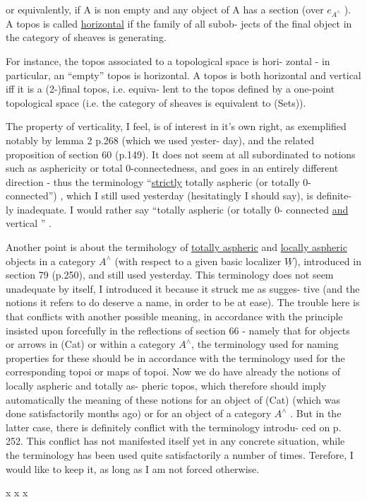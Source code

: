 or equivalently,  if A is non empty and any object of A has a section
(over $e_{A^\wedge}$ ).  A topos is called \uline{horizontal} if the family of all subob-%
jects of the final object in the category of sheaves  is generating.

For instance,  the topos associated to a topological space is hori-%
zontal -  in particular,  an ``empty'' topos is horizontal.  A topos is
both horizontal and vertical iff it is a (2-)final topos,  i.e. equiva-%
lent to the topos defined by a one-point topological space  (i.e. the
category of sheaves is equivalent to (Sets)).

The property of verticality, I feel,  is of interest in it's own
right,  as exemplified notably by lemma 2 p.268 (which we used yester-%
day),  and the related proposition of section 60 (p.149).  It does not
seem at all subordinated to notions such as  asphericity or total
0-connectedness,  and goes in an entirely different direction  - thus
the terminology  ``\uline{strictly} totally aspheric (or totally 0-connected'') ,
which I still used yesterday (hesitatingly\hand{,} I should say),  is definite-%
ly inadequate.  I would rather say  ``totally aspheric (or totally 0-%
connected\hand{)} \uline{and} vertical '' .

  Another point is about the termihology
of \uline{totally aspheric} and \uline{locally aspheric} objects in a category $A^\wedge$
(with respect to a given basic localizer $\underline{W}$),  introduced in section
79 (p.250),  and still used yesterday.  This terminology does not seem
unadequate by itself,  I introduced it because it struck me as sugges-%
tive (and the notions it refers to do deserve a name,  in order to be
at ease).  The trouble here is that  conflicts with another possible
meaning,  in accordance with the principle insisted upon forcefully
in the reflections of section 66  -  namely that for objects or arrows
in (Cat) \hand{,} or within a category $A^\wedge$,  the terminology used for naming
properties for these should be  in accordance with the
terminology used for the corresponding topoi or maps of topoi.  Now
 we do have already the notions of  locally aspheric and totally as-%
pheric topos,  which therefore should imply automatically the meaning
of these notions for an object of (Cat)  (which was done satisfactorily
months ago)\hand{,} or for an object of a category $A^\wedge$ .  But in the latter
case, there is definitely conflict with the  terminology introdu-%
ced on p. 252.  This conflict has not manifested itself yet in any
concrete situation,  while the  terminology  has been used
quite satisfactorily a number of times.  Terefore,  I would like to
keep it,  as long as I am not forced otherwise.

x x x

